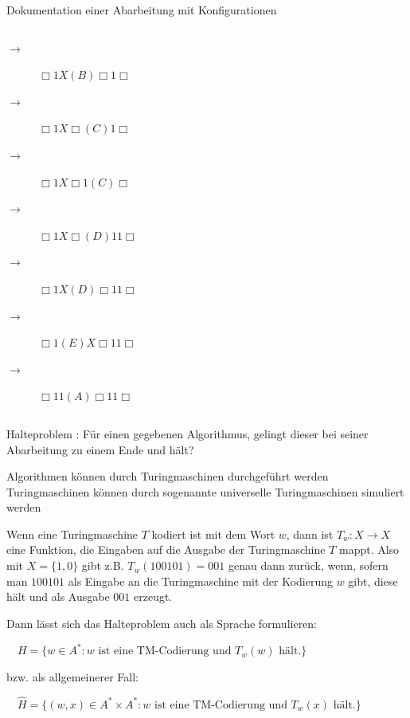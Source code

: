\documentclass{beamer}
\begin{document}
\begin{frame}{Dokumentation einer Abarbeitung mit Konfigurationen}
\begin{columns}
		\begin{column}{0.4\textwidth}
			\begin{description}
				\pause\item[$\rightarrow$] $\Box 1 X (B) \Box 1\Box$
				\pause\item[$\rightarrow$] $\Box 1 X \Box (C) 1\Box$
				\pause\item[$\rightarrow$] $\Box 1 X \Box 1 (C)\Box$
				\pause\item[$\rightarrow$] $\Box 1 X \Box (D) 1 1\Box$
				\pause\item[$\rightarrow$] $\Box 1 X (D) \Box 1 1\Box$
				\pause\item[$\rightarrow$] $\Box 1 (E) X \Box 1 1\Box$
				\pause\item[$\rightarrow$] $\Box 1 1 (A) \Box 1 1\Box$
			\end{description}
		\end{column}
	\end{columns}
\end{frame}

\begin{frame}{Halteproblem}
	: Für einen gegebenen Algorithmus, gelingt dieser bei seiner Abarbeitung zu einem Ende und hält?
	
	\begin{itemize}
		\pitem Algorithmen können durch Turingmaschinen durchgeführt werden
		\pitem Turingmaschinen können durch sogenannte universelle Turingmaschinen simuliert werden
		\begin{itemize}
			\pitem Wenn eine Turingmaschine $T$ kodiert ist mit dem Wort $w$, dann ist $T_w: X \rightarrow X$ eine Funktion, die Eingaben auf die Ausgabe der Turingmaschine $T$ mappt.
			\pitem Also mit $X = \{1,0\}$ gibt z.B. $T_w(100101) = 001$ genau dann zurück, wenn, sofern man $100101$ als Eingabe an die Turingmaschine mit der Kodierung $w$ gibt, diese hält und als Ausgabe $001$ erzeugt.
		\end{itemize}
	\end{itemize}

	\bp
	
	Dann lässt sich das Halteproblem auch als Sprache formulieren:
	
	\vspace{.2cm}
	
	$\quad H = \{w \in A^* : w \text{ ist eine TM-Codierung und } T_w(w) \text{ hält.}\}$
	
	bzw. als allgemeinerer Fall:
	
	$\quad \hat{H} = \{(w,x) \in A^* \times A^* : w \text{ ist eine TM-Codierung und } T_w(x) \text{ hält.}\}$
\end{frame}
\end{document}
